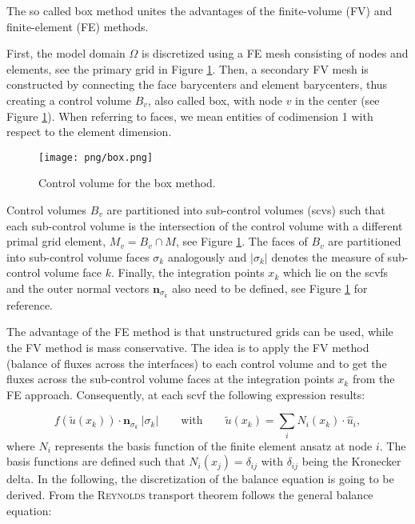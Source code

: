 The so called box method unites the advantages of the finite-volume (FV) and
finite-element (FE) methods.

First, the model domain $\Omega$ is discretized using a FE mesh consisting of nodes and elements, see the primary grid in Figure \ref{pc:box}. Then, a secondary FV mesh is constructed
by connecting the face barycenters and element barycenters, thus creating a control volume $B_v$, also called box, with node $v$ in the center (see Figure \ref{pc:box}). When referring to faces, we mean entities of codimension 1 with respect to the element dimension.

\begin{figure} [ht]
\centering
\texttt{[image: png/box.png]}
\caption{\label{pc:box} Control volume for the box method.}
\end{figure}

Control volumes $B_v$ are partitioned into sub-control volumes (scvs) such that each sub-control volume is the intersection of the control volume with a different primal grid element, $M_v =
B_v \cap M$, see Figure \ref{pc:box}. The faces of $B_v$ are partitioned into sub-control volume faces $\sigma_k$ analogously and $|\sigma_k|$ denotes the measure of sub-control volume face $k$.
Finally, the integration points $x_k$ which lie on the scvfs and the outer normal
vectors $\mathbf n_{\sigma_k}$ also need to be defined, see Figure \ref{pc:box} for reference.

The advantage of the FE method is that unstructured grids can be used, while the
FV method is mass conservative. The idea is to apply the FV method (balance of
fluxes across the interfaces) to each control volume and to get the fluxes across
the sub-control volume faces at the integration points $x_k$ from the FE approach.
Consequently, at each scvf the following expression results:

\begin{equation}
   f(\tilde u(x_k)) \cdot \mathbf n_{\sigma_k} \: |\sigma_k| \qquad \textrm{with}
   \qquad \tilde u(x_k) = \sum_i N_i(x_k) \cdot \hat u_i,
\end{equation}
where $N_i$ represents the basis function of the finite element ansatz at node $i$. The basis functions are defined such that $N_i(x_j)=\delta_{ij}$ with $\delta_{ij}$ being the Kronecker delta.
In the following, the discretization of the balance equation is going to be derived.
From the \textsc{Reynolds} transport theorem follows the general balance equation:

